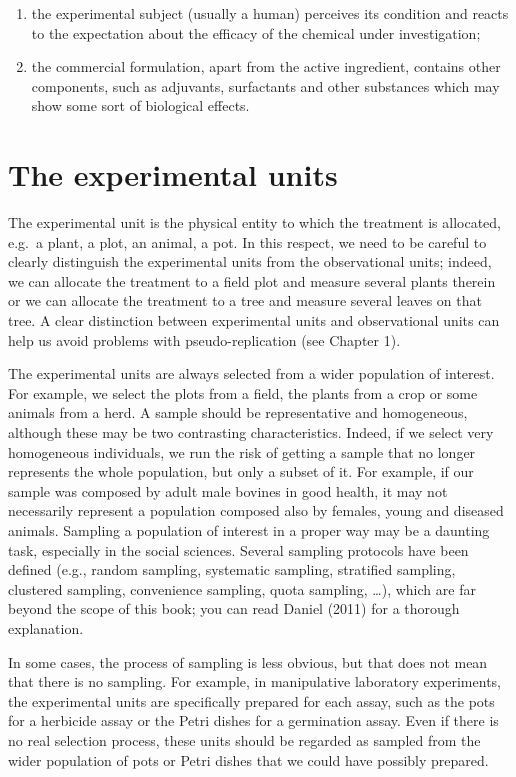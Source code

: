 \documentclass[a4paper,12pt,oneside]{book}
\providecommand{\tightlist}{%
  \setlength{\itemsep}{0pt}\setlength{\parskip}{0pt}}
\begin{document}
\begin{enumerate}
\def\labelenumi{\arabic{enumi}.}
\tightlist
\item
  the experimental subject (usually a human) perceives its condition and reacts to the expectation about the efficacy of the chemical under investigation;
\item
  the commercial formulation, apart from the active ingredient, contains other components, such as adjuvants, surfactants and other substances which may show some sort of biological effects.
\end{enumerate}

\hypertarget{the-experimental-units}{%
\section{The experimental units}\label{the-experimental-units}}

The experimental unit is the physical entity to which the treatment is allocated, e.g.~a plant, a plot, an animal, a pot. In this respect, we need to be careful to clearly distinguish the experimental units from the observational units; indeed, we can allocate the treatment to a field plot and measure several plants therein or we can allocate the treatment to a tree and measure several leaves on that tree. A clear distinction between experimental units and observational units can help us avoid problems with pseudo-replication (see Chapter 1).

The experimental units are always selected from a wider population of interest. For example, we select the plots from a field, the plants from a crop or some animals from a herd. A sample should be representative and homogeneous, although these may be two contrasting characteristics. Indeed, if we select very homogeneous individuals, we run the risk of getting a sample that no longer represents the whole population, but only a subset of it. For example, if our sample was composed by adult male bovines in good health, it may not necessarily represent a population composed also by females, young and diseased animals. Sampling a population of interest in a proper way may be a daunting task, especially in the social sciences. Several sampling protocols have been defined (e.g., random sampling, systematic sampling, stratified sampling, clustered sampling, convenience sampling, quota sampling, \ldots), which are far beyond the scope of this book; you can read Daniel (2011) for a thorough explanation.

In some cases, the process of sampling is less obvious, but that does not mean that there is no sampling. For example, in manipulative laboratory experiments, the experimental units are specifically prepared for each assay, such as the pots for a herbicide assay or the Petri dishes for a germination assay. Even if there is no real selection process, these units should be regarded as sampled from the wider population of pots or Petri dishes that we could have possibly prepared.
\end{document}
